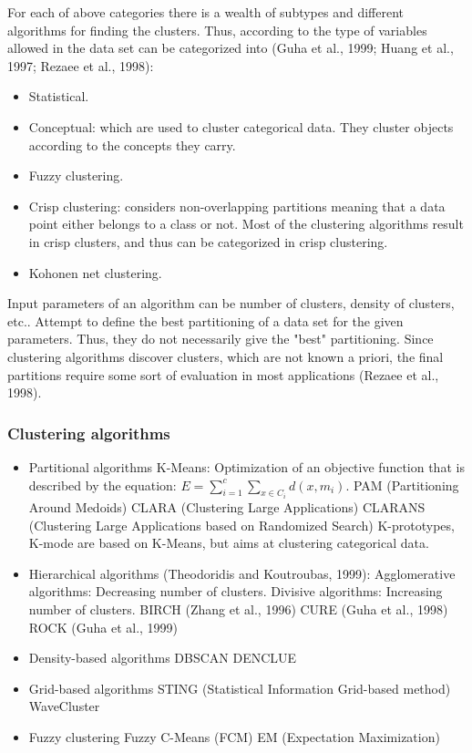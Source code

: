 \documentclass[a4paper,10pt]{article}
\begin{document}
For each of above categories there is a wealth of subtypes and different algorithms for finding the clusters. Thus, according to the type of variables allowed in the data set can be categorized into (Guha et al., 1999; Huang et al., 1997; Rezaee et al., 1998):
\begin{itemize}
	\item Statistical.
	\item Conceptual: which are used to cluster categorical data. They cluster objects according to the concepts they carry.
	\item Fuzzy clustering.
	\item Crisp clustering: considers non-overlapping partitions meaning that a data point either belongs to a class or not. Most of the clustering algorithms result in crisp clusters, and thus can be categorized in crisp clustering.
	\item Kohonen net clustering.
\end{itemize}
Input parameters of an algorithm can be number of clusters, density of clusters, etc.. Attempt to define the best partitioning of a data set for the given parameters. Thus, they do not necessarily give the "best" partitioning. Since clustering algorithms discover clusters, which are not known a priori, the final partitions require some sort of evaluation in most applications (Rezaee et al., 1998).

\subsubsection{Clustering algorithms}
\begin{itemize}
	\item Partitional algorithms
		\subitem K-Means: Optimization of an objective function that is described by the equation: $E = \sum_{i = 1}^{c} \sum_{x \in C_{i}} d(x, m_{i})$.
		\subitem PAM (Partitioning Around Medoids)
		\subitem CLARA (Clustering Large Applications)
		\subitem CLARANS (Clustering Large Applications based on Randomized Search)
		\subitem K-prototypes, K-mode are based on K-Means, but aims at clustering categorical data.
	\item Hierarchical algorithms (Theodoridis and Koutroubas, 1999):
		\subitem Agglomerative algorithms: Decreasing number of clusters.
		\subitem Divisive algorithms: Increasing number of clusters.
		\subitem BIRCH (Zhang et al., 1996)
		\subitem CURE (Guha et al., 1998)
		\subitem ROCK (Guha et al., 1999)
	\item Density-based algorithms
		\subitem DBSCAN
		\subitem DENCLUE
	\item Grid-based algorithms
		\subitem STING (Statistical Information Grid-based method)
		\subitem WaveCluster
	\item Fuzzy clustering
		\subitem Fuzzy C-Means (FCM)
		\subitem EM (Expectation Maximization)
\end{itemize}
\end{document}
